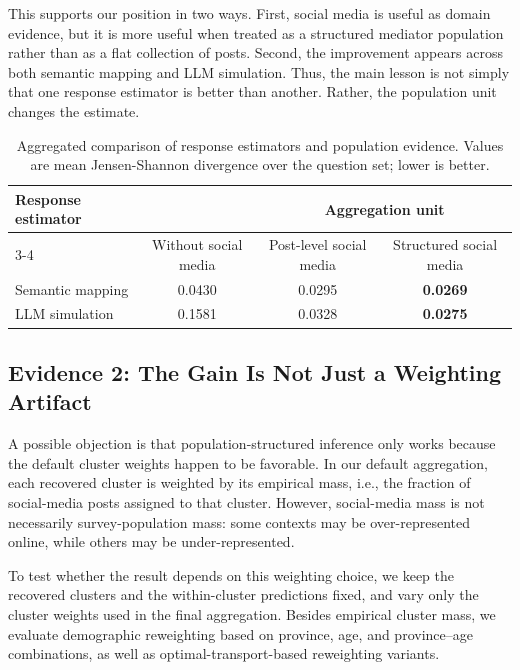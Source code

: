 \documentclass{article}
\begin{document}
This supports our position in two ways.
First, social media is useful as domain evidence, but it is more useful when treated as a
structured mediator population rather than as a flat collection of posts.
Second, the improvement appears across both semantic mapping and LLM simulation.
Thus, the main lesson is not simply that one response estimator is better than another.
Rather, the population unit changes the estimate.

\begin{table}[htb!]
\centering
\small
\begin{tabular}{lccc}
\toprule
\multirow{2}{*}{Response estimator} &
& \multicolumn{2}{c}{Aggregation unit} \\
\cmidrule(lr){3-4}
& Without social media & Post-level social media & Structured social media \\
\midrule
Semantic mapping & 0.0430 & 0.0295 & \textbf{0.0269} \\
LLM simulation & 0.1581 & 0.0328 & \textbf{0.0275} \\
\bottomrule
\end{tabular}
\caption{Aggregated comparison of response estimators and population evidence. Values are mean Jensen-Shannon divergence over the question set; lower is better.}
\label{tab:2by2_results}
\end{table}

\subsection{Evidence 2: The Gain Is Not Just a Weighting Artifact}
\label{clustering_scheme}

A possible objection is that population-structured inference only works because the
default cluster weights happen to be favorable.
In our default aggregation, each recovered cluster is weighted by its empirical mass,
i.e., the fraction of social-media posts assigned to that cluster.
However, social-media mass is not necessarily survey-population mass: some contexts may
be over-represented online, while others may be under-represented.

To test whether the result depends on this weighting choice, we keep the recovered
clusters and the within-cluster predictions fixed, and vary only the cluster weights used
in the final aggregation.
Besides empirical cluster mass, we evaluate demographic reweighting based on province,
age, and province--age combinations, as well as optimal-transport-based reweighting
variants.
\end{document}
